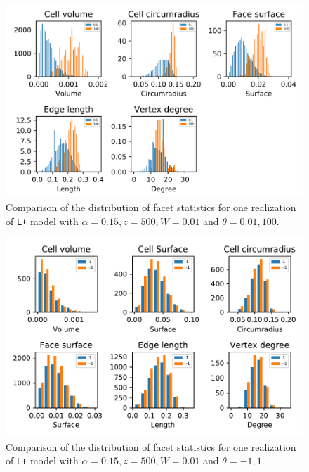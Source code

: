 \begin{figure}
  \centering
    \includegraphics[width=1\textwidth]{../img/numeric/thetacomparison.png}
  \caption{Comparison of the distribution of facet statistics for one realization of \texttt{L+} model with $\alpha=0.15,z=500,W=0.01$ and $\theta = 0.01,100$.  }
\end{figure}


\begin{figure}
  \centering
    \includegraphics[width=1\textwidth]{../img/numeric/facets_1_-1.pdf}
  \caption{Comparison of the distribution of facet statistics for one realization of \texttt{L+} model with $\alpha=0.15,z=500,W=0.01$ and $\theta = -1,1$.  }
\end{figure}




